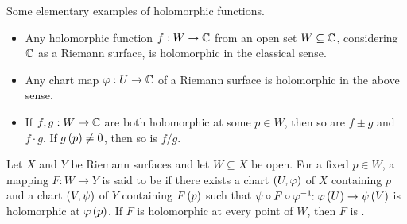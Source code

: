 \documentclass[../Moduli_Spaces_of_Riemann_Surfaces.tex]{subfiles}
\begin{document}
    \begin{example}\label{1.2:exa:elementary_holomorphic_functions}
        Some elementary examples of holomorphic functions.
        \begin{itemize}
            \item Any holomorphic function $f:W\to\mathbb{C}$ from an open set $W\subseteq\mathbb{C}$, considering $\mathbb{C}$ as a Riemann surface, is holomorphic in the classical sense.
            \item Any chart map $\varphi:U\to\mathbb{C}$ of a Riemann surface is holomorphic in the above sense.
            \item If $f,g:W\to\mathbb{C}$ are both holomorphic at some $p\in W$, then so are $f\pm g$ and $f\cdot g$. If $g\left(p\right)\neq0$, then so is $f/g$.\exqed
        \end{itemize}
    \end{example}
    \begin{definition}
        Let $X$ and $Y$ be Riemann surfaces and let $W\subseteq X$ be open. For a fixed $p\in W$, a mapping $F:W\to Y$ is said to be  if there exists a chart $\left(U,\varphi\right)$ of $X$ containing $p$ and a chart $\left(V,\psi\right)$ of $Y$ containing $F\left(p\right)$ such that $\psi\circ F\circ\varphi^{-1}\!\!:\varphi\left(U\right)\to\psi\left(V\right)$ is holomorphic at $\varphi\left(p\right)$. If $F$ is holomorphic at every point of $W$, then $F$ is .
    \end{definition}
\end{document}
